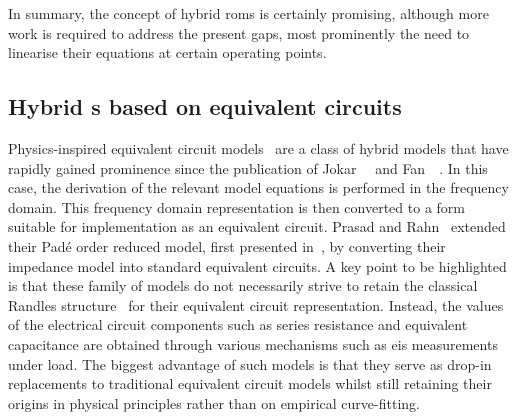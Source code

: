 In summary, the  concept of hybrid \glspl{rom} is  certainly promising, although
more work is required to address the  present gaps, most prominently the need to
linearise their equations at certain operating points.


\subsection{Hybrid s based on equivalent circuits}

Physics-inspired                        equivalent                       circuit
models~\cite{Prasad2012,Prasad2014,Zhang2017,Cheng2017,Merla2018} are a class of
hybrid  models that  have rapidly  gained  prominence since  the publication  of
Jokar~\etal~\cite{Jokar2016}  and Fan~\etal~\cite{Fan2015}.  In  this case,  the
derivation of the relevant model equations is performed in the frequency domain.
This frequency  domain representation is then  converted to a form  suitable for
implementation  as  an  equivalent circuit.  Prasad  and  Rahn~\cite{Prasad2014}
extended their Padé order  reduced model, first presented in~\cite{Prasad2013},
by converting  their impedance  model into standard  equivalent circuits.  A key
point  to be  highlighted is  that  these family  of models  do not  necessarily
strive to  retain the  classical Randles structure~\cite{Randles1947}  for their
equivalent circuit representation. Instead, the values of the electrical circuit
components such  as series  resistance and  equivalent capacitance  are obtained
through  various  mechanisms such  as  \gls{eis}  measurements under  load.  The
biggest advantage of  such models is that they serve  as drop-in replacements to
traditional equivalent  circuit models whilst  still retaining their  origins in
physical principles rather than on empirical curve-fitting.







